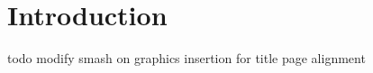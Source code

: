 \documentclass[memo]{corpboreport}
\begin{document}


%
%
%
%
%
%
%
%
%


\section{Introduction}

todo modify smash on graphics insertion for title page alignment
\end{document}
